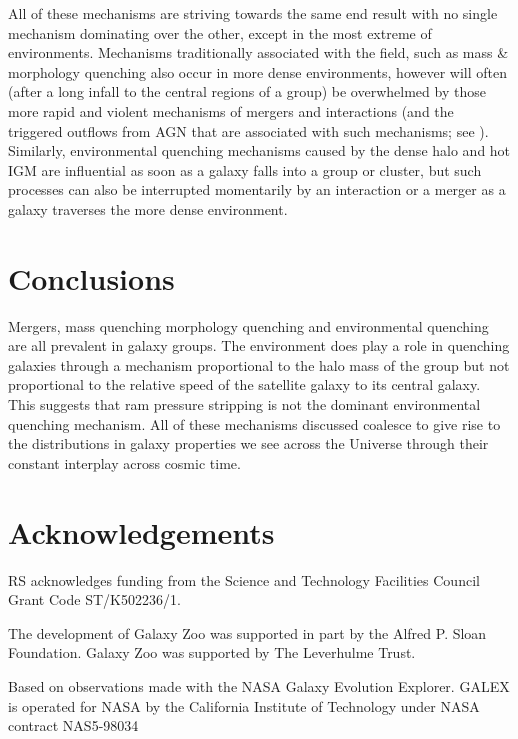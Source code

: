 \documentclass[useAMS,usenatbib]{mn2e}
\begin{document}
All of these mechanisms are striving towards the same end result with no single mechanism dominating over the other, except in the most extreme of environments. Mechanisms traditionally associated with the field, such as mass \& morphology quenching also occur in more dense environments, however will often (after a long infall to the central regions of a group) be overwhelmed by those more rapid and violent mechanisms of mergers and interactions (and the triggered outflows from AGN that are associated with such mechanisms; see \citealt{smethurst16}). Similarly, environmental quenching mechanisms caused by the dense halo and hot IGM are influential as soon as a galaxy falls into a group or cluster, but such processes can also be interrupted momentarily by an interaction or a merger as a galaxy traverses the more dense environment.   


\section{Conclusions}\label{sec:conc}

Mergers, mass quenching morphology quenching and environmental quenching are all prevalent in galaxy groups. The environment does play a role in quenching galaxies through a mechanism proportional to the halo mass of the group but not proportional to the relative speed of the satellite galaxy to its central galaxy. This suggests that ram pressure stripping is not the dominant environmental quenching mechanism. All of these mechanisms discussed coalesce to give rise to the distributions in galaxy properties we see across the Universe through their constant interplay across cosmic time. 

\section*{Acknowledgements}

RS acknowledges funding from the Science and Technology Facilities Council Grant Code ST/K502236/1. 

The development of Galaxy Zoo was supported in part by the Alfred P. Sloan Foundation. Galaxy Zoo was supported by The Leverhulme Trust. 

Based on observations made with the NASA Galaxy Evolution Explorer.  GALEX is operated for NASA by the California Institute of Technology under NASA contract NAS5-98034
\end{document}
